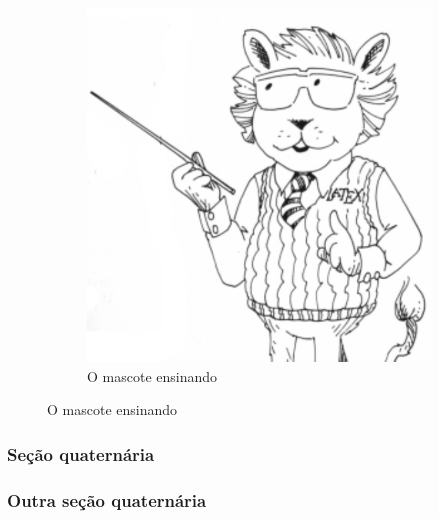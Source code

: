 \begin{figure}[ht]
\begin{subfigure}[t]{.4\textwidth}
        \includegraphics[width=\textwidth]{figuras/latex_lion.pdf}
        \caption{O mascote ensinando}\label{fig:mascote2}
    \end{subfigure}
\end{figure}

\subsubsection{Seção quaternária}\label{sec:quaternaria}

\lipsum[1]

\subsubsection{Outra seção quaternária}\label{sec:quaternariaoutra}

\lipsum[1]

\label{sec:quinaria}

\lipsum[1]